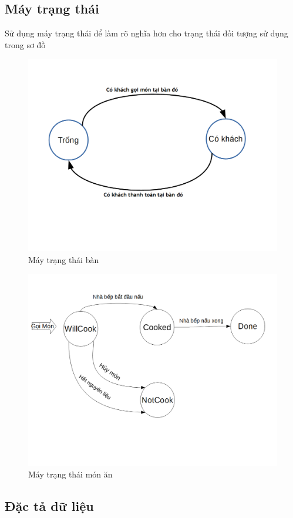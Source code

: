 \documentclass[a4paper,12pt]{report}
\begin{document}
\subsection{Máy trạng thái}
Sử dụng máy trạng thái để làm rõ nghĩa hơn cho trạng thái đối tượng sử dụng trong sơ đồ
\begin{figure}[!]
\centering
\includegraphics[scale=0.5]{FSM_ban.png}
\caption{Máy trạng thái bàn}
\end{figure}
\begin{figure}[!]
\centering
\includegraphics[scale=0.5]{FSM_monan.png}
\caption{Máy trạng thái món ăn}
\end{figure}
\subsection{Đặc tả dữ liệu}
\end{document}
